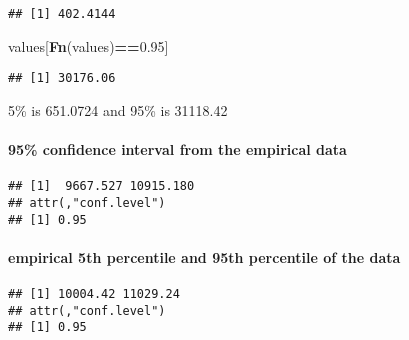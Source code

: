 \documentclass[]{article}
\newenvironment{Shaded}{\begin{snugshade}}{\end{snugshade}}
\newcommand{\FloatTok}[1]{\textcolor[rgb]{0.00,0.00,0.81}{#1}}
\newcommand{\KeywordTok}[1]{\textcolor[rgb]{0.13,0.29,0.53}{\textbf{#1}}}
\newcommand{\NormalTok}[1]{#1}
\newcommand{\OperatorTok}[1]{\textcolor[rgb]{0.81,0.36,0.00}{\textbf{#1}}}
\let\oldparagraph\paragraph
\renewcommand{\paragraph}[1]{\oldparagraph{#1}\mbox{}}
\begin{document}
\begin{verbatim}
## [1] 402.4144
\end{verbatim}

\begin{Shaded}
\begin{Highlighting}[]
\NormalTok{values[}\KeywordTok{Fn}\NormalTok{(values)}\OperatorTok{==}\FloatTok{0.95}\NormalTok{]}
\end{Highlighting}
\end{Shaded}

\begin{verbatim}
## [1] 30176.06
\end{verbatim}

5\% is 651.0724 and 95\% is 31118.42

\hypertarget{confidence-interval-from-the-empirical-data}{%
\paragraph{95\% confidence interval from the empirical
data}\label{confidence-interval-from-the-empirical-data}}

\begin{Shaded}
\end{Shaded}

\begin{verbatim}
## [1]  9667.527 10915.180
## attr(,"conf.level")
## [1] 0.95
\end{verbatim}

\hypertarget{empirical-5th-percentile-and-95th-percentile-of-the-data}{%
\paragraph{empirical 5th percentile and 95th percentile of the
data}\label{empirical-5th-percentile-and-95th-percentile-of-the-data}}

\begin{Shaded}
\end{Shaded}

\begin{verbatim}
## [1] 10004.42 11029.24
## attr(,"conf.level")
## [1] 0.95
\end{verbatim}
\end{document}
